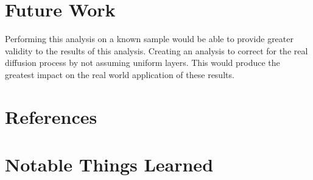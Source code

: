 \documentclass{article}
\begin{document}
\begin{multicols}{2}
\section{Future Work}

    Performing this analysis on a known sample would be able to provide greater validity to the results of this analysis.
    Creating an analysis to correct for the real diffusion process by not assuming uniform layers.
    This would produce the greatest impact on the real world application of these results.

\section{References}
    


\end{multicols}

\section{Notable Things Learned}



% 
\end{document}
